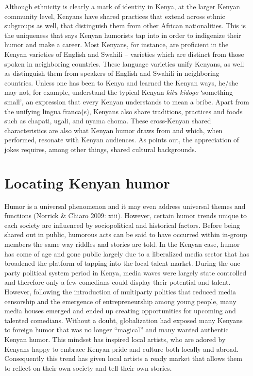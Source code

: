 \documentclass[output=paper]{langsci/langscibook}
\begin{document}
\begin{styleListParagraph}
  Although ethnicity is clearly a mark of identity in Kenya, at the larger Kenyan community level, Kenyans have shared practices that extend across ethnic subgroups as well, that distinguish them from other African nationalities. This is the uniqueness that \citet[5]{Tumusiime2013} says Kenyan humorists tap into in order to indigenize their humor and make a career. Most Kenyans, for instance, are proficient in the Kenyan varieties of English and Swahili – varieties which are distinct from those spoken in neighboring countries. These language varieties unify Kenyans, as well as distinguish them from speakers of English and Swahili in neighboring countries. Unless one has been to Kenya and learned the Kenyan ways, he/she may not, for example, understand the typical Kenyan \textit{kitu kidogo }‘something small’, an expression that every Kenyan understands to mean a bribe. Apart from the unifying lingua franca(s), Kenyans also share traditions, practices and foods such as chapati, ugali, and nyama choma. These cross-Kenyan shared characteristics are also what Kenyan humor draws from and which, when performed, resonate with Kenyan audiences. As \citet{Chiaro1992} points out, the appreciation of jokes requires, among other things, shared cultural backgrounds.
\end{styleListParagraph}

\section{ Locating Kenyan humor }

   Humor is a universal phenomenon and it may even address universal themes and functions (Norrick \& Chiaro 2009: xiii). However, certain humor trends unique to each society are influenced by sociopolitical and historical factors. Before being shared out in public, humorous acts can be said to have occurred within in-group members the same way riddles and stories are told. In the Kenyan case, humor has come of age and gone public largely due to a liberalized media sector that has broadened the platform of tapping into the local talent market. During the one-party political system period in Kenya, media waves were largely state controlled and therefore only a few comedians could display their potential and talent. However, following the introduction of multiparty politics that reduced media censorship and the emergence of entrepreneurship among young people, many media houses emerged and ended up creating opportunities for upcoming and talented comedians. Without a doubt, globalization had exposed many Kenyans to foreign humor that was no longer “magical” and many wanted authentic Kenyan humor. This mindset has inspired local artists, who are adored by Kenyans happy to embrace Kenyan pride and culture both locally and abroad. Consequently this trend has given local artists a ready market that allows them to reflect on their own society and tell their own stories. 
\end{document}
